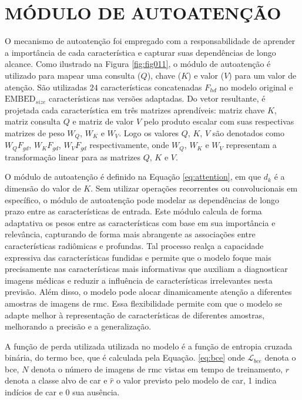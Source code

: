 \section{MÓDULO DE AUTOATENÇÃO}
\label{subsec:cap4_mod_self_attnn}

O mecanismo de autoatenção foi empregado com a responsabilidade de aprender a importância de cada característica e capturar suas dependências de longo alcance. Como ilustrado na Figura \ref{fig:fig011}, o módulo de autoatenção é utilizado para mapear uma consulta ($Q$), chave ($K$) e valor ($V$) para um valor de atenção. São utilizadas $24$ características concatenadas $F_{hd}$ no modelo original e $\text{EMBED}_{size}$ características nas versões adaptadas. Do vetor resultante, é projetada cada característica em três matrizes aprendíveis: matriz chave $K$, matriz consulta $Q$ e matriz de valor $V$ pelo produto escalar com suas respectivas matrizes de peso $W_{Q}$, $W_{K}$ e $W_{V}$. Logo os valores $Q$, $K$, $V$ são denotados como $W_{Q}F_{gd}$, $W_{K}F_{gd}$, $W_{V}F_{gd}$ respectivamente, onde $W_{Q}$, $W_{K}$ e $W_{V}$ representam a transformação linear para as matrizes $Q$, $K$ e $V$. 

O módulo de autoatenção é definido na Equação \ref{eq:attention}, em que $d_{k}$ é a dimensão do valor de $K$. Sem utilizar operações recorrentes ou convolucionais em específico, o módulo de autoatenção pode modelar as dependências de longo prazo entre as características de entrada.
Este módulo calcula de forma adaptativa os pesos entre as características com base em sua importância e relevância, capturando de forma mais abrangente as associações entre características radiômicas e profundas. Tal processo realça a capacidade expressiva das características fundidas e permite que o modelo foque mais precisamente nas características mais informativas que auxiliam a diagnosticar imagens médicas e reduzir a influência de características irrelevantes nesta previsão. Além disso, o modelo pode alocar dinamicamente atenção a diferentes amostras de imagens de \gls{rmc}. Essa flexibilidade permite com que o modelo se adapte melhor à representação de características de diferentes amostras, melhorando a precisão e a generalização.

A função de perda utilizada utilizada no modelo é a função de entropia cruzada binária, do termo  \gls{bce}, que é calculada pela Equação. \ref{eq:bce} onde $\mathcal{L}_{bce}$ denota o \gls{bce}, $N$ denota o número de imagens de \gls{rmc} vistas em tempo de treinamento, $r$ denota a classe alvo de \gls{car} e $\hat{r}$ o valor previsto pelo modelo de \gls{car}, 1 indica indícios de \gls{car} e 0 sua ausência.

